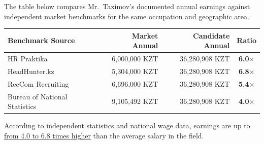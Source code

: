 The table below compares Mr.~Taximov’s documented annual earnings against independent market benchmarks for the same occupation and geographic area.

\begin{center}
\renewcommand{\arraystretch}{1.5}
\begin{tabular}{l r r c}
\hline
\textbf{Benchmark Source} & \textbf{Market Annual} & \textbf{Candidate Annual} & \textbf{Ratio} \\
\hline
HR Praktika & 6{,}000{,}000 KZT & 36{,}280{,}908 KZT & \textbf{6.0$\times$} \\
HeadHunter.kz & 5{,}304{,}000 KZT & 36{,}280{,}908 KZT & \textbf{6.8$\times$} \\
RecCom Recruiting & 6{,}696{,}000 KZT & 36{,}280{,}908 KZT & \textbf{5.4$\times$} \\
Bureau of National Statistics & 9{,}105{,}492 KZT & 36{,}280{,}908 KZT & \textbf{4.0$\times$} \\
\hline
\end{tabular}
\end{center}

\noindent According to independent statistics and national wage data, \mrls earnings are up to \underline{from 4.0 to 6.8 times higher} than the average salary in the field.


\newpage